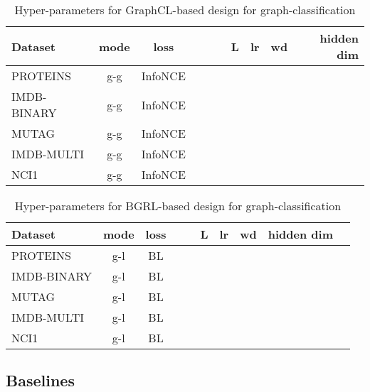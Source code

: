 \documentclass{article}
\theoremstyle{plain}
\theoremstyle{definition}
\theoremstyle{remark}
\begin{document}
\begin{table}[H]
\centering
\caption{Hyper-parameters for GraphCL-based design for graph-classification}
\label{table:hp_graphcl}
\vskip 0.15in
\begin{center}
\begin{small}
\begin{sc}
\begin{tabular}{lccccccccr}
\toprule
Dataset & mode & loss &  & &  & L & lr & wd & hidden dim \\
\midrule
PROTEINS & g-g & InfoNCE &  &  &  &  &  &  & \\
IMDB-BINARY & g-g & InfoNCE &  &  &  &  &  &  & \\
MUTAG & g-g & InfoNCE &  &  &  &  &  &  & \\
IMDB-MULTI & g-g & InfoNCE &  &  &  &  &  &  & \\
NCI1 & g-g & InfoNCE &  &  &  &  &  &  & \\
\bottomrule
\end{tabular}
\end{sc}
\end{small}
\end{center}
\vskip -0.1in
\end{table}


\begin{table}[H]
\centering
\caption{Hyper-parameters for BGRL-based design for graph-classification}
\label{table:hp_bgrl}
\vskip 0.15in
\begin{center}
\begin{small}
\begin{sc}
\begin{tabular}{lccccccccr}
\toprule
Dataset & mode & loss &  &  & L & lr & wd & hidden dim \\
\midrule
PROTEINS & g-l & BL &  &  &  &  &  & \\
IMDB-BINARY & g-l & BL &  &  &  &  &  & \\
MUTAG & g-l & BL &  &  &  &  &  & \\
IMDB-MULTI & g-l & BL &  &  &  &  &  & \\
NCI1 & g-l & BL &  &  &  &  &  & \\
\bottomrule
\end{tabular}
\end{sc}
\end{small}
\end{center}
\vskip -0.1in
\end{table}

\subsection{Baselines}
\end{document}
